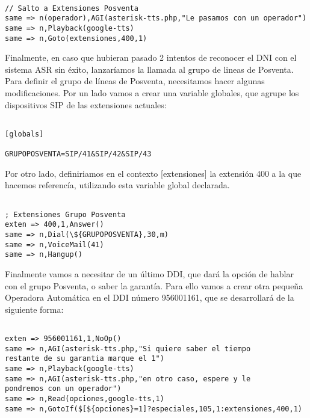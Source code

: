 \begin{lstlisting}[style=bash,title={(/etc/asterisk/extensions.conf}]

// Salto a Extensiones Posventa
same => n(operador),AGI(asterisk-tts.php,"Le pasamos con un operador")
same => n,Playback(google-tts)
same => n,Goto(extensiones,400,1)

\end{lstlisting}

Finalmente, en caso que hubieran pasado 2 intentos de reconocer el DNI con el sistema ASR sin éxito, lanzaríamos la llamada al grupo de lineas de Posventa. Para definir el grupo de líneas de Posventa, necesitamos hacer algunas modificaciones. Por un lado vamos a crear una variable globales, que agrupe los dispositivos SIP de las extensiones actuales:

\begin{lstlisting}[style=bash,title={(/etc/asterisk/extensions.conf}]

[globals]

GRUPOPOSVENTA=SIP/41&SIP/42&SIP/43

\end{lstlisting}

Por otro lado, definiriamos en el contexto [extensiones] la extensión 400 a la que hacemos referencía, utilizando esta variable global declarada.

\begin{lstlisting}[style=bash,title={(/etc/asterisk/extensions.conf}]

; Extensiones Grupo Posventa
exten => 400,1,Answer()
same => n,Dial(\${GRUPOPOSVENTA},30,m)
same => n,VoiceMail(41)
same => n,Hangup()

\end{lstlisting}

Finalmente vamos a necesitar de un último DDI, que dará la opción de hablar con el grupo Posventa, o saber la garantía. Para ello vamos a crear otra pequeña Operadora Automática en el DDI número 956001161, que se desarrollará de la siguiente forma:

\begin{lstlisting}[style=bash,title={(/etc/asterisk/extensions.conf}]

exten => 956001161,1,NoOp()
same => n,AGI(asterisk-tts.php,"Si quiere saber el tiempo 
restante de su garantia marque el 1")
same => n,Playback(google-tts)
same => n,AGI(asterisk-tts.php,"en otro caso, espere y le 
pondremos con un operador")
same => n,Read(opciones,google-tts,1)
same => n,GotoIf($[${opciones}=1]?especiales,105,1:extensiones,400,1)

\end{lstlisting}

